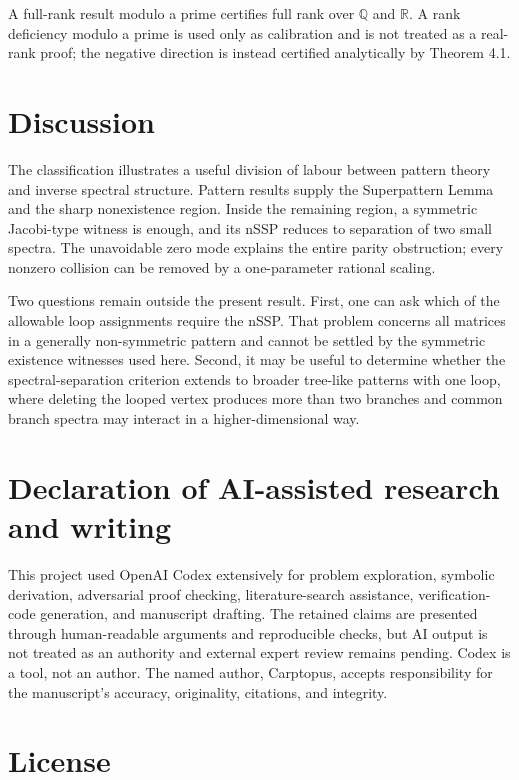 \documentclass[11pt]{article}
\theoremstyle{remark}
\begin{document}
A full-rank result modulo a prime certifies full rank over $\mathbb Q$ and $\mathbb R$. A rank
deficiency modulo a prime is used only as calibration and is not treated as a real-rank proof; the
negative direction is instead certified analytically by Theorem 4.1.

\section{Discussion}


The classification illustrates a useful division of labour between pattern theory and inverse spectral
structure. Pattern results supply the Superpattern Lemma and the sharp nonexistence region. Inside the
remaining region, a symmetric Jacobi-type witness is enough, and its nSSP reduces to separation of two
small spectra. The unavoidable zero mode explains the entire parity obstruction; every nonzero collision
can be removed by a one-parameter rational scaling.

Two questions remain outside the present result. First, one can ask which of the allowable loop
assignments require the nSSP. That problem concerns all matrices in a generally non-symmetric pattern and
cannot be settled by the symmetric existence witnesses used here. Second, it may be useful to determine
whether the spectral-separation criterion extends to broader tree-like patterns with one loop, where
deleting the looped vertex produces more than two branches and common branch spectra may interact in a
higher-dimensional way.

\section*{Declaration of AI-assisted research and writing}


This project used OpenAI Codex extensively for problem exploration, symbolic derivation, adversarial
proof checking, literature-search assistance, verification-code generation, and manuscript drafting.
The retained claims are presented through human-readable arguments and reproducible checks, but AI output
is not treated as an authority and external expert review remains pending. Codex is a tool, not an author.
The named author, Carptopus, accepts responsibility for the manuscript's accuracy, originality,
citations, and integrity.

\section*{License}
\end{document}
